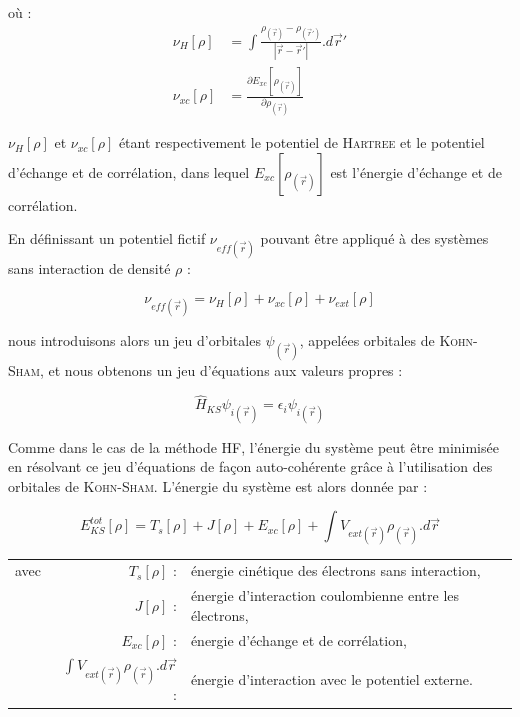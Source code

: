 \noindent où :
\begin{align}
\nu_{H}[\rho] &= \int \frac{\rho_{(\vec{r})} - \rho_{(\vec{r}')}}{|\vec{r} - \vec{r}'|} .d\vec{r}' \\
\nu_{xc}[\rho] &= \frac{\partial E_{xc}[\rho_{(\vec{r})}]}{\partial\rho_{(\vec{r})}}
\end{align}

\noindent $\nu_{H}[\rho]$ et $\nu_{xc}[\rho]$ étant respectivement le potentiel de \textsc{Hartree} et le potentiel d'échange et de corrélation, dans lequel $E_{xc}[\rho_{(\vec{r})}]$ est l'énergie d'échange et de corrélation.

En définissant un potentiel fictif $\nu_{eff(\vec{r})}$ pouvant être appliqué à des systèmes sans interaction de densité $\rho$ :

\begin{equation}
\nu_{eff(\vec{r})} = \nu_{H}[\rho] + \nu_{xc}[\rho] + \nu_{ext}[\rho]
\end{equation}

\noindent nous introduisons alors un jeu d'orbitales $\psi_{(\vec{r})}$, appelées orbitales de \textsc{Kohn-Sham}, et nous obtenons un jeu d'équations aux valeurs propres :

\begin{equation}
\hat{H}_{KS} \psi_{i(\vec{r})} = \epsilon_{i} \psi_{i(\vec{r})}
\end{equation}

Comme dans le cas de la méthode HF, l'énergie du système peut être minimisée en résolvant ce jeu d'équations de façon auto-cohérente grâce à l'utilisation des orbitales de \textsc{Kohn-Sham}. L'énergie du système est alors donnée par :

\begin{equation}
E_{KS}^{tot}[\rho] = T_{s}[\rho] + J[\rho] + E_{xc}[\rho] + \int V_{ext(\vec{r})}\rho_{(\vec{r})} .d\vec{r}
\end{equation}

\begin{flushleft}
\begin{tabular}{@{}lrp{10cm}}
avec & $T_{s}[\rho]$ : & énergie cinétique des électrons sans interaction, \\
& $J[\rho]$ : & énergie d'interaction coulombienne entre les électrons, \\
& $E_{xc}[\rho]$ : & énergie d'échange et de corrélation, \\
& $\int V_{ext(\vec{r})}\rho_{(\vec{r})} .d\vec{r}$ : & énergie d'interaction avec le potentiel externe. 
\end{tabular}
\end{flushleft}

